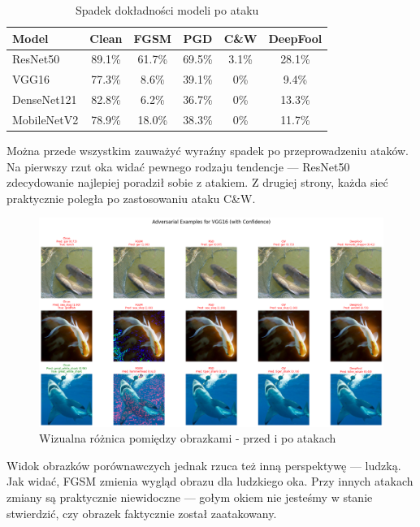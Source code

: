 \documentclass[12pt]{article}
\begin{document}
\begin{table}[H]
    \centering
    \begin{tabular}{|l|c|c|c|c|c|}
    \hline
    \textbf{Model} & \textbf{Clean} & \textbf{FGSM} & \textbf{PGD} & \textbf{C\&W} & \textbf{DeepFool} \\
    \hline
    ResNet50 & 89.1\% & 61.7\% & 69.5\% & 3.1\% & 28.1\% \\
    VGG16 & 77.3\% & 8.6\% & 39.1\% & 0\% & 9.4\% \\
    DenseNet121 & 82.8\% & 6.2\% & 36.7\% & 0\% & 13.3\% \\
    MobileNetV2 & 78.9\% & 18.0\% & 38.3\% & 0\% & 11.7\% \\
    \hline
    \end{tabular}
    \caption{Spadek dokładności modeli po ataku}
\end{table}

Można przede wszystkim zauważyć wyraźny spadek po przeprowadzeniu ataków. Na pierwszy rzut oka widać pewnego rodzaju tendencje — ResNet50 zdecydowanie najlepiej poradził sobie z atakiem. Z drugiej strony, każda sieć praktycznie poległa po zastosowaniu ataku C\&W.

\begin{figure} [H]
    \centering
    \includegraphics[width=1\textwidth]{adversarial_examples.png}
    \caption{Wizualna różnica pomiędzy obrazkami - przed i po atakach}
    \label{fig:enter-label}
\end{figure}

Widok obrazków porównawczych jednak rzuca też inną perspektywę — ludzką. Jak widać, FGSM zmienia wygląd obrazu dla ludzkiego oka. Przy innych atakach zmiany są praktycznie niewidoczne — gołym okiem nie jesteśmy w stanie stwierdzić, czy obrazek faktycznie został zaatakowany.
\end{document}
